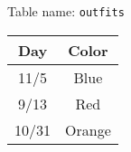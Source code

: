 Table name: \texttt{outfits}
\begin{center}
\begin{tabular}{|c|c|}
 \hline
 \textbf{Day} & \textbf{Color} \\
 \hline
 11/5 & Blue \\
 \hline
 9/13 & Red \\
 \hline
 10/31 & Orange \\
 \hline
\end{tabular}
\end{center}